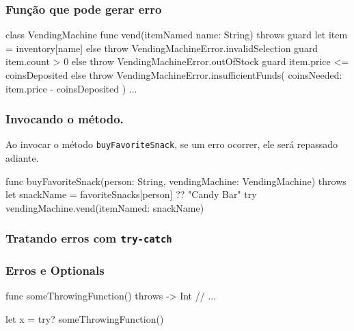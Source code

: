 \begin{frame}[fragile]
    \frametitle{Função que pode gerar erro}
    \begin{swift}[basicstyle=\footnotesize]
class VendingMachine {
    func vend(itemNamed name: String) throws {
        guard let item = inventory[name] else
        { throw VendingMachineError.invalidSelection }
        guard item.count > 0 else
        { throw VendingMachineError.outOfStock }
        guard item.price <= coinsDeposited else {
            throw VendingMachineError.insufficientFunds(
                        coinsNeeded: item.price - coinsDeposited
                    )
        }
        ...
    }
}
    \end{swift}
\end{frame}

\begin{frame}[fragile]
    \frametitle{Invocando o método.}
    Ao invocar o método \texttt{buyFavoriteSnack}, se um erro ocorrer,
    ele será repassado adiante.

    \begin{swift}[basicstyle=\small]
func buyFavoriteSnack(person: String,
                      vendingMachine: VendingMachine) throws
{
    let snackName = favoriteSnacks[person] ?? "Candy Bar"
    try vendingMachine.vend(itemNamed: snackName)
}
    \end{swift}
\end{frame}

\begin{frame}[fragile]
    \frametitle{Tratando erros com \texttt{try-catch}}
\end{frame}

\begin{frame}[fragile]
    \frametitle{Erros e Optionals}

\begin{swift}
func someThrowingFunction() throws -> Int {
    // ...
}

let x = try? someThrowingFunction()
\end{swift}

\end{frame}

